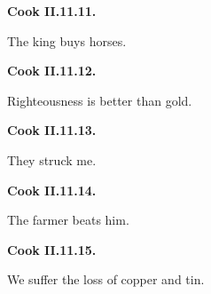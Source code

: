 \par\begin{minipage}{\linewidth}\raggedright
\textbf{Cook II.11.11.}

The king buys horses.

\end{minipage}\par\addvspace{4pt}

\par\begin{minipage}{\linewidth}\raggedright
\textbf{Cook II.11.12.}

Righteousness is better than gold.

\end{minipage}\par\addvspace{4pt}

\par\begin{minipage}{\linewidth}\raggedright
\textbf{Cook II.11.13.}

They struck me.

\end{minipage}\par\addvspace{4pt}

\par\begin{minipage}{\linewidth}\raggedright
\textbf{Cook II.11.14.}

The farmer beats him.

\end{minipage}\par\addvspace{4pt}

\par\begin{minipage}{\linewidth}\raggedright
\textbf{Cook II.11.15.}

We suffer the loss of copper and tin.

\end{minipage}\par\addvspace{4pt}

